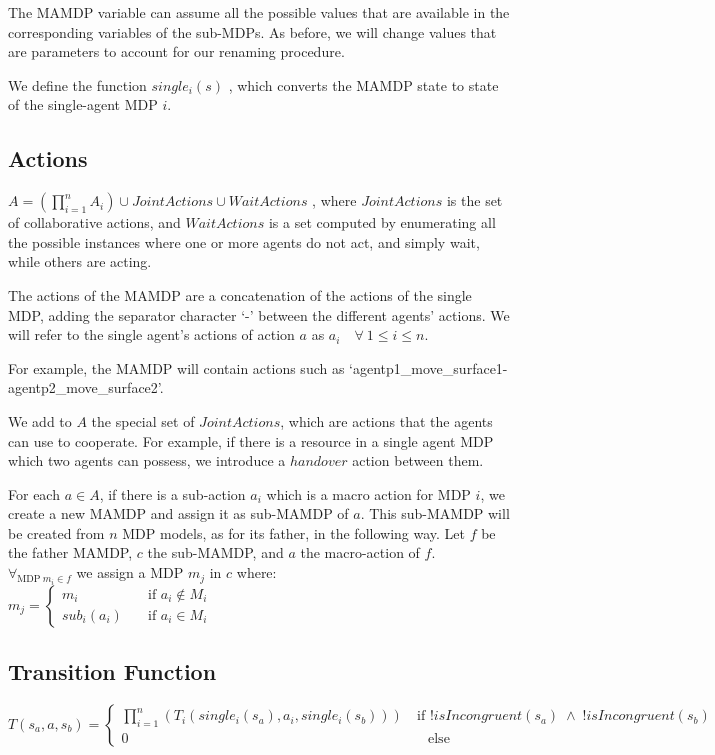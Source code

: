 The MAMDP variable can assume all the possible values that are available in the corresponding variables of the sub-MDPs. As before, we will change values that are parameters to account for our renaming procedure. 

We define the function $single_i(s)$ , which converts the MAMDP state to state of the single-agent MDP $i$.


\subsection{Actions}
$A=(\prod_{i=1}^{n} A_i) \cup JointActions \cup WaitActions$ , where $JointActions$ is the set of collaborative actions, and $WaitActions$ is a set computed by enumerating all the possible instances where one or more agents do not act, and simply wait, while others are acting.

The actions of the MAMDP are a concatenation of the actions of the single MDP, adding the separator character `-' between the different agents' actions. We will refer to the single agent's actions of action $a$ as $a_i \quad \forall \> 1\leq i \leq n$.

For example, the MAMDP will contain actions such as `agentp1\_move\_surface1-agentp2\_move\_surface2'.

We add to $A$ the special set of $JointActions$, which are actions that the agents can use to cooperate. For example, if there is a resource in a single agent MDP which two agents can possess, we introduce a $handover$ action between them. 

For each $a \in A$, if there is a sub-action $a_i$ which is a macro action for MDP $i$, we create a new MAMDP and assign it as sub-MAMDP of $a$. This sub-MAMDP will be created from $n$ MDP models, as for its father, in the following way. Let $f$ be the father MAMDP, $c$ the sub-MAMDP, and $a$ the macro-action of $f$. \\
 $ \forall_{\text{MDP}\> m_i \in f}$ we assign a MDP $m_j$ in $c$ where:\\
$m_j= \begin{cases}
	m_i & \quad \text{if } a_i \not\in M_i \\
	sub_i(a_i) & \quad \text{if } a_i \in M_i 
\end{cases}$ \\

\subsection{Transition Function}
\label{subsec:mamdp-transition}
$T(s_a,a,s_b)=
\begin{cases}
\prod_{i=1}^{n}(T_i(single_i(s_a),a_i,single_i(s_b))) & \> \text{if } !isIncongruent(s_a)\; \land  \;!isIncongruent(s_b)  \\
0   & \quad \text{else}
	\end{cases}$ \\

